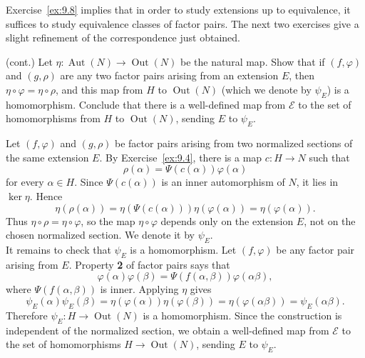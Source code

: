 \documentclass[../Odyssey_Project.tex]{subfiles}
\begin{document}
Exercise~\ref{ex:9.8} implies that in order to study extensions up to equivalence, it suffices to study equivalence classes of factor pairs. The next two exercises give a slight refinement of the correspondence just obtained.

\begin{exercise}
\label{ex:9.9}
(cont.) Let $\eta: \operatorname{Aut}(N) \to \operatorname{Out}(N)$ be the natural map. Show that if $(f, \varphi)$ and $(g, \rho)$ are any two factor pairs arising from an extension $E$, then $\eta \circ \varphi = \eta \circ \rho$, and this map from $H$ to $\operatorname{Out}(N)$ (which we denote by $\psi_E$) is a homomorphism. Conclude that there is a well-defined map from $\mathcal{E}$ to the set of homomorphisms from $H$ to $\operatorname{Out}(N)$, sending $E$ to $\psi_E$.
\end{exercise}
\begin{solution}
Let $(f,\varphi)$ and $(g,\rho)$ be factor pairs arising from two normalized sections of the same extension $E$. By Exercise~\ref{ex:9.4}, there is a map $c\colon H\to N$ such that
\[
    \rho(\alpha)=\Psi(c(\alpha))\varphi(\alpha)
\]
for every $\alpha\in H$. Since $\Psi(c(\alpha))$ is an inner automorphism of $N$, it lies in $\ker\eta$. Hence
\[
    \eta(\rho(\alpha))
    =
    \eta(\Psi(c(\alpha)))\eta(\varphi(\alpha))
    =
    \eta(\varphi(\alpha)).
\]
Thus $\eta\circ\rho=\eta\circ\varphi$, so the map $\eta\circ\varphi$ depends only on the extension $E$, not on the chosen normalized section. We denote it by $\psi_E$.\\
It remains to check that $\psi_E$ is a homomorphism. Let $(f,\varphi)$ be any factor pair arising from $E$. Property \textbf{2} of factor pairs says that
\[
    \varphi(\alpha)\varphi(\beta)
    =
    \Psi(f(\alpha,\beta))\varphi(\alpha\beta),
\]
where $\Psi(f(\alpha,\beta))$ is inner. Applying $\eta$ gives
\[
    \psi_E(\alpha)\psi_E(\beta)
    =
    \eta(\varphi(\alpha))\eta(\varphi(\beta))
    =
    \eta(\varphi(\alpha\beta))
    =
    \psi_E(\alpha\beta).
\]
Therefore $\psi_E\colon H\to\operatorname{Out}(N)$ is a homomorphism. Since the construction is independent of the normalized section, we obtain a well-defined map from $\mathcal{E}$ to the set of homomorphisms $H\to\operatorname{Out}(N)$, sending $E$ to $\psi_E$.
\end{solution}
\end{document}
